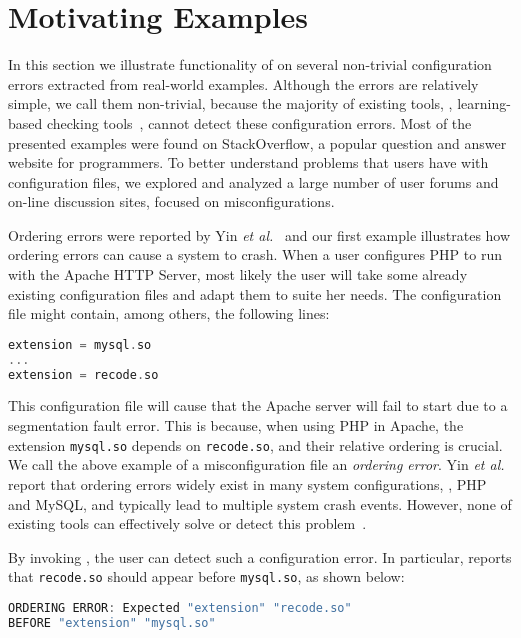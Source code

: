 \section{Motivating Examples}
\label{sec-motiv}

In this section we illustrate functionality of \app on several non-trivial configuration errors
extracted from real-world examples. Although the errors are relatively simple, we call them 
non-trivial, because the majority of existing tools, \eg, learning-based checking
tools~\cite{zhang14encore, wang04automatic}, cannot detect
these configuration errors. Most of the presented examples were found on StackOverflow,
a popular question and answer website for programmers. To better understand problems that users have with 
configuration files, we explored and analyzed a large number of user forums and on-line discussion sites, focused on misconfigurations.


Ordering errors were reported by Yin {\em et al.}~\cite{yin11anempirical} and our first
example illustrates how ordering errors can cause a system to crash. When a user configures PHP 
to run with the
Apache HTTP Server, most likely the user will take some already existing configuration files and adapt them
to suite her needs. The configuration file might contain, among others, 
the following lines:
\begin{lstlisting}[language=C, xleftmargin=.01\textwidth]
extension = mysql.so
...
extension = recode.so
\end{lstlisting} 

This configuration file will cause that the Apache server will
fail to start due to a segmentation fault error. 
This is because, when using PHP in Apache, the extension {\tt mysql.so} 
depends on {\tt recode.so}, and their relative ordering
is crucial. 
We call the above example of a misconfiguration file
an {\em ordering error}.
Yin {\em et al.} report that ordering errors widely exist in
many system configurations, \eg, PHP and MySQL,
and typically lead to multiple system crash events.
However, none of existing tools can effectively solve 
or detect this problem~\cite{zhang14encore, xu15systems, xu13do}.

By invoking \app, the user can detect such a configuration error.
In particular, \app reports that {\tt recode.so} 
should appear before {\tt mysql.so}, as shown
below:

\begin{lstlisting}[language=C, xleftmargin=.01\textwidth]
ORDERING ERROR: Expected "extension" "recode.so"
BEFORE "extension" "mysql.so"
\end{lstlisting} 

